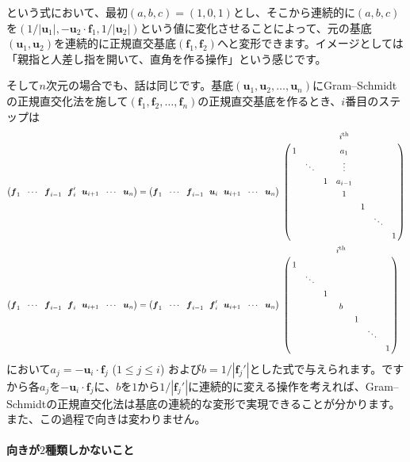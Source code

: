 という式において、最初$(a, b ,c) = (1, 0, 1)$とし、そこから連続的に$(a, b, c)$を$(1/|\bm{u}_1|, -\bm{u}_2 \cdot \bm{f}_1, 1/|\bm{u}_2|)$という値に変化させることによって、元の基底$(\bm{u}_1, \bm{u}_2)$を連続的に正規直交基底$(\bm{f}_1, \bm{f}_2)$へと変形できます。イメージとしては「親指と人差し指を開いて、直角を作る操作」という感じです。

そして$n$次元の場合でも、話は同じです。基底$(\bm{u}_1, \bm{u}_2, \ldots, \bm{u}_n)$にGram--Schmidtの正規直交化法を施して$(\bm{f}_1, \bm{f}_2, \ldots, \bm{f}_n)$の正規直交基底を作るとき、$i$番目のステップは
\begin{align*}
\bigl(\bm{f}_1 \ \  \cdots \ \  \bm{f}_{i - 1} \ \  \bm{f}_i' \ \  \bm{u}_{i + 1} \ \  \cdots \ \  \bm{u}_n \bigr)
&=
\bigl(\bm{f}_1 \ \  \cdots \ \  \bm{f}_{i - 1} \ \  \bm{u}_i \ \  \bm{u}_{i + 1} \ \  \cdots \ \  \bm{u}_n \bigr)
\bordermatrix{
& & & & i^{\text{th}} \\
& 1 & & & a_1 \\
& & \ddots & & \vdots \\
& & & 1 & a_{i - 1} \\
& & & & 1 \\
& & & & & 1 \\
& & & & & & \ddots \\
& & & & & & & 1
}
\\
\bigl(\bm{f}_1 \ \  \cdots \ \  \bm{f}_{i - 1} \ \  \bm{f}_i \ \  \bm{u}_{i + 1} \ \  \cdots \ \  \bm{u}_n \bigr)
&=
\bigl(\bm{f}_1 \ \  \cdots \ \  \bm{f}_{i - 1} \ \  \bm{f}_i' \ \  \bm{u}_{i + 1} \ \  \cdots \ \  \bm{u}_n \bigr)
\bordermatrix{
& & & & i^{\text{th}} \\
& 1 & \\
& & \ddots \\
& & & 1 \\
& & & & b \\
& & & & & 1 \\
& & & & & & \ddots \\
& & & & & & & 1
}
\end{align*}
において$a_j = - \bm{u}_i \cdot \bm{f}_j$ ($1 \leq j \leq i$) および$b = 1/|\bm{f}_j'|$とした式で与えられます。ですから各$a_j$を$- \bm{u}_i \cdot \bm{f}_j$に、$b$を$1$から$1/|\bm{f}_j'|$に連続的に変える操作を考えれば、Gram--Schmidtの正規直交化法は基底の連続的な変形で実現できることが分かります。また、この過程で向きは変わりません。

\paragraph{向きが$2$種類しかないこと}

